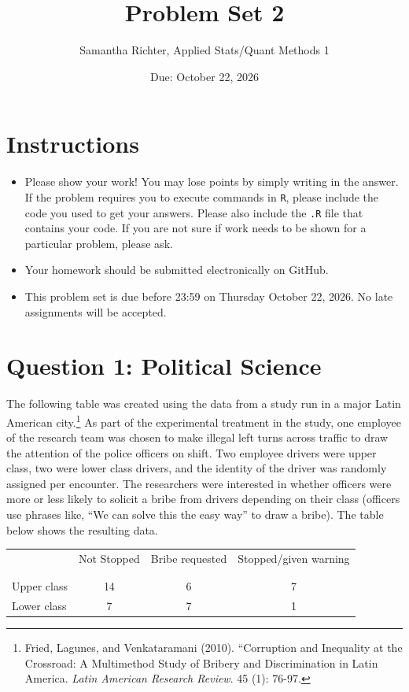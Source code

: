 \documentclass[12pt,letterpaper]{article}
\title{Problem Set 2}
\date{Due: October 22, 2026}
\author{Samantha Richter, Applied Stats/Quant Methods 1}
\begin{document}
	\maketitle
	\section*{Instructions}
\begin{itemize}
	\item Please show your work! You may lose points by simply writing in the answer. If the problem requires you to execute commands in \texttt{R}, please include the code you used to get your answers. Please also include the \texttt{.R} file that contains your code. If you are not sure if work needs to be shown for a particular problem, please ask.
	\item Your homework should be submitted electronically on GitHub.
	\item This problem set is due before 23:59 on Thursday October 22, 2026. No late assignments will be accepted.

\end{itemize}

	
	\vspace{.5cm}
	\section*{Question 1: Political Science}
		\vspace{.25cm}
	The following table was created using the data from a study run in a major Latin American city.\footnote{Fried, Lagunes, and Venkataramani (2010). ``Corruption and Inequality at the Crossroad: A Multimethod Study of Bribery and Discrimination in Latin America. \textit{Latin American Research Review}. 45 (1): 76-97.} As part of the experimental treatment in the study, one employee of the research team was chosen to make illegal left turns across traffic to draw the attention of the police officers on shift. Two employee drivers were upper class, two were lower class drivers, and the identity of the driver was randomly assigned per encounter. The researchers were interested in whether officers were more or less likely to solicit a bribe from drivers depending on their class (officers use phrases like, ``We can solve this the easy way'' to draw a bribe). The table below shows the resulting data.

\newpage
\begin{table}[h!]
	\centering
	\begin{tabular}{l | c c c }
		& Not Stopped & Bribe requested & Stopped/given warning \\
		\\[-1.8ex] 
		\hline \\[-1.8ex]
		Upper class & 14 & 6 & 7 \\
		Lower class & 7 & 7 & 1 \\
		\hline
	\end{tabular}
\end{table}
\end{document}
